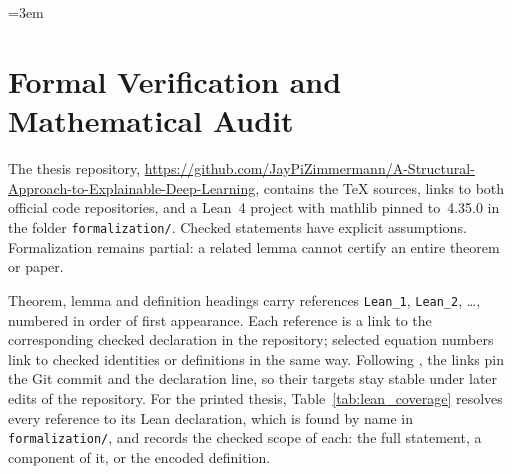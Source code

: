 \subsection{\texorpdfstring{}{Code and Correctness Tests}}\label{ptnb:app:code-tests}

\begingroup\emergencystretch=3em
\par\medskip
\endgroup

\section{Formal Verification and Mathematical Audit}\label{app:lean}\label{app:lean_details}

The thesis repository, \url{https://github.com/JayPiZimmermann/A-Structural-Approach-to-Explainable-Deep-Learning}, contains the TeX sources, links to both official code repositories, and a Lean~4 project with mathlib pinned to~4.35.0 in the folder \texttt{formalization/}. Checked statements have explicit assumptions. Formalization remains partial: a related lemma cannot certify an entire theorem or paper.

Theorem, lemma and definition headings carry references \texttt{Lean\_1}, \texttt{Lean\_2}, \ldots, numbered in order of first appearance. Each reference is a link to the corresponding checked declaration in the repository; selected equation numbers link to checked identities or definitions in the same way. Following \textcite{Zimmermann2026PlanarFeatures}, the links pin the Git commit and the declaration line, so their targets stay stable under later edits of the repository. For the printed thesis, Table~\ref{tab:lean_coverage} resolves every reference to its Lean declaration, which is found by name in \texttt{formalization/}, and records the checked scope of each: the full statement, a component of it, or the encoded definition.

